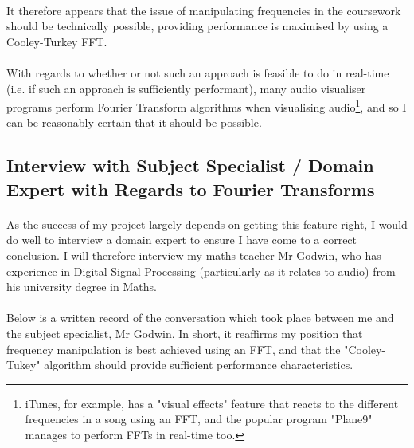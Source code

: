 \paragraph{}
It therefore appears that the issue of manipulating frequencies in the coursework should be technically possible, providing performance is maximised by using a Cooley-Turkey FFT.

\paragraph{}
With regards to whether or not such an approach is feasible to do in real-time (i.e. if such an approach is sufficiently performant), many audio visualiser programs perform Fourier Transform algorithms when visualising audio\footnote{
	iTunes, for example, has a "visual effects" feature that reacts to the different frequencies in a song using an FFT, and the popular program "Plane9" manages to perform FFTs in real-time too.
},  and so I can be reasonably certain that it should be possible.

\pagebreak
\subsection{Interview with Subject Specialist / Domain Expert with Regards to Fourier Transforms}
\paragraph{}
As the success of my project largely depends on getting this feature right, I would do well to interview a domain expert to ensure I have come to a correct conclusion. I will therefore interview my maths teacher Mr Godwin, who has experience in Digital Signal Processing (particularly as it relates to audio) from his university degree in Maths.

\paragraph{}
Below is a written record of the conversation which took place between me and the subject specialist, Mr Godwin. In short, it reaffirms my position that frequency manipulation is best achieved using an FFT, and that the "Cooley-Tukey" algorithm should provide sufficient performance characteristics.

